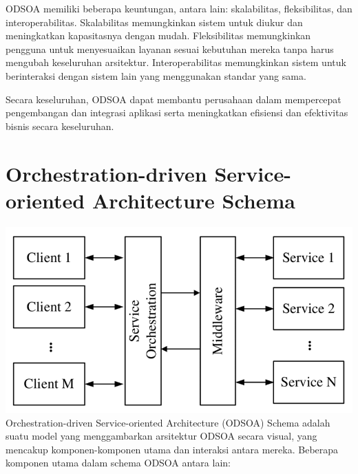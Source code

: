\documentclass{article}
\begin{document}
	ODSOA memiliki beberapa keuntungan, antara lain: skalabilitas, fleksibilitas, dan interoperabilitas. Skalabilitas memungkinkan sistem untuk diukur dan meningkatkan kapasitasnya dengan mudah. Fleksibilitas memungkinkan pengguna untuk menyesuaikan layanan sesuai 		kebutuhan mereka tanpa harus mengubah keseluruhan arsitektur. Interoperabilitas memungkinkan sistem untuk berinteraksi dengan sistem lain yang menggunakan standar yang sama.

	Secara keseluruhan, ODSOA dapat membantu perusahaan dalam mempercepat pengembangan dan integrasi aplikasi serta meningkatkan efisiensi dan efektivitas bisnis secara keseluruhan.
	
	\section{Orchestration-driven Service-oriented Architecture Schema
	}
	\includegraphics[scale=0.4]{images/ODSOA.png}
	Orchestration-driven Service-oriented Architecture (ODSOA) Schema adalah suatu model yang menggambarkan arsitektur ODSOA secara visual, yang mencakup komponen-komponen utama dan interaksi antara mereka. Beberapa komponen utama dalam schema ODSOA 		antara lain:
\end{document}

